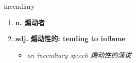 
\begin{frame}
{\huge incendiary}
\begin{center}
\begin{enumerate}\Large
  \item \textbf{n. 煽动者}
  \item \textbf{adj. 煽动性的: tending to inflame}
  \begin{itemize}
    \item \em{\Large{an incendiary speech 煽动性的演说}}
  \end{itemize}
\end{enumerate}
\end{center}
\end{frame}
